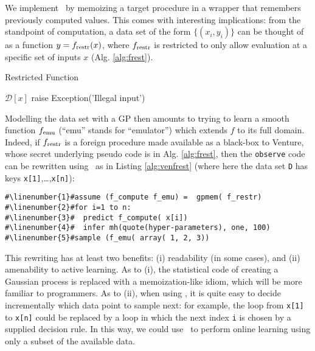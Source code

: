 \label{sec:special-case-gpmem}
We implement \gpmem\ by memoizing a target procedure in a wrapper that remembers previously computed values.
This comes with interesting implications:
from the standpoint of computation, a data set of the form $\{(x_i, y_i)\}$ can be thought of as a function $y = f_{\textrm{restr}}(x)$, where $f_{\textrm{restr}}$ is restricted to only allow evaluation at a specific set of inputs $x$ (Alg. \ref{alg:frest}).
\begin{algorithm}

\caption{Restricted Function}

\begin{algorithmic}[1]

 \State \Return $\mathcal{D}[x]$
\Else
 \State raise Exception('Illegal input')
\EndIf 
\EndFunction

\end{algorithmic}
  \label{alg:frest}


\end{algorithm}
Modelling the data set with a \ac{GP} then amounts to trying to learn a smooth function $f_{\textrm{emu}}$ (``emu'' stands for ``emulator'') which extends $f$ to its full domain.
Indeed, if $f_{\textrm{restr}}$ is a foreign procedure made available as a black-box to Venture, whose secret underlying pseudo code is in Alg. \ref{alg:frest},
then the \texttt{observe} code can be rewritten using \gpmem\ as in Listing \ref{alg:venfrest} (where here the data set \texttt{D} has keys \texttt{x[1]},\ldots,\texttt{x[n]}):
\begin{mdframed}
\begin{minipage}{0.9\linewidth}
\small
\begin{lstlisting}[mathescape,label=alg:venfrest,basicstyle=\selectfont\ttfamily,numbers=none,caption={Observation with \gpmem},escapechar=\#]
#\linenumber{1}#assume (f_compute f_emu) =  gpmem( f_restr)
#\linenumber{2}#for i=1 to n:
#\linenumber{3}#  predict f_compute( x[i])
#\linenumber{4}#  infer mh(quote(hyper-parameters), one, 100)
#\linenumber{5}#sample (f_emu( array( 1, 2, 3))
\end{lstlisting}
\end{minipage}
\end{mdframed}


\vspace{0.2cm}
This rewriting has at least two benefits: (i) readability (in some cases), and (ii) amenability to active learning.
As to (i), the statistical code of creating a Gaussian process is replaced with a memoization-like idiom, which will be more familiar to programmers.
As to (ii), when using \gpmem, it is quite easy to decide incrementally which data point to sample next: for example, the loop from \texttt{x[1]} to \texttt{x[n]} could be replaced by a loop in which the next index \texttt{i} is chosen by a supplied decision rule.
In this way, we could use \gpmem\ to perform online learning using only a subset of the available data.

